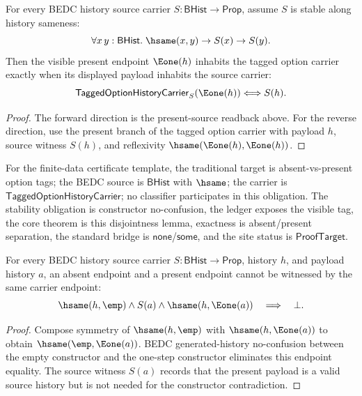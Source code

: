 \begin{theorem}
\label{thm:tagged-option-history-carrier-e1-source-iff}
For every BEDC history source carrier $S:\mathsf{BHist}\to\mathsf{Prop}$,
assume $S$ is stable along history sameness:
$$
\forall x\,y:\mathsf{BHist}.\;\hsame(x,y)\to S(x)\to S(y).
$$
Then the visible present endpoint $\Eone(h)$ inhabits the tagged option carrier
exactly when its displayed payload inhabits the source carrier:
$$
\mathsf{TaggedOptionHistoryCarrier}_S(\Eone(h))\Longleftrightarrow S(h).
$$
\end{theorem}
\begin{proof}
The forward direction is the present-source readback above. For the reverse
direction, use the present branch of the tagged option carrier with payload
$h$, source witness $S(h)$, and reflexivity
$\hsame(\Eone(h),\Eone(h))$.
\end{proof}

For the finite-data certificate template, the traditional target is
absent-vs-present option tags; the BEDC source is $\mathsf{BHist}$ with
$\hsame$; the carrier is $\mathsf{TaggedOptionHistoryCarrier}$; no classifier
participates in this obligation. The stability obligation is constructor
no-confusion, the ledger exposes the visible tag, the core theorem is this
disjointness lemma, exactness is absent/present separation, the standard bridge
is $\mathsf{none}$/$\mathsf{some}$, and the site status is
$\mathsf{ProofTarget}$.

\begin{lemma}
\label{lem:tagged-option-history-carrier-constructor-separation}
For every BEDC history source carrier $S:\mathsf{BHist}\to\mathsf{Prop}$, history $h$, and payload history $a$, an absent endpoint and a present endpoint cannot be witnessed by the same carrier endpoint:
$$
\hsame(h,\emp)\land S(a)\land \hsame(h,\Eone(a))
\quad\Longrightarrow\quad
\bot.
$$
\end{lemma}
\begin{proof}
Compose symmetry of $\hsame(h,\emp)$ with $\hsame(h,\Eone(a))$ to obtain $\hsame(\emp,\Eone(a))$. BEDC generated-history no-confusion between the empty constructor and the one-step constructor eliminates this endpoint equality. The source witness $S(a)$ records that the present payload is a valid source history but is not needed for the constructor contradiction.
\end{proof}

